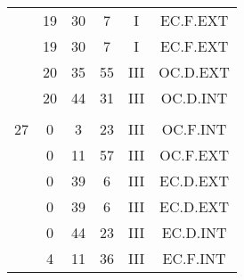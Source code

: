 \documentclass[12pt, a4paper]{article}
\begin{document}
\begin{multicols}{3}
{\begin{tabular}{c c c c c c}
	 	 	 	 & 19 & 30 & 7 & I & EC.F.EXT\\%
	 	 	 	 & 19 & 30 & 7 & I & EC.F.EXT\\%
	 	 	 	 & 20 & 35 & 55 & III & OC.D.EXT\\%
	 	 	 	 & 20 & 44 & 31 & III & OC.D.INT\\%
	 	 	 	 & & & & & \\%
	 	 	 	27 & 0 & 3 & 23 & III & OC.F.INT\\%
	 	 	 	 & 0 & 11 & 57 & III & OC.F.EXT\\%
	 	 	 	 & 0 & 39 & 6 & III & EC.D.EXT\\%
	 	 	 	 & 0 & 39 & 6 & III & EC.D.EXT\\%
	 	 	 	 & 0 & 44 & 23 & III & EC.D.INT\\%
	 	 	 	 & 4 & 11 & 36 & III & EC.F.INT\\%
	 	 \end{tabular}
 	}
\end{multicols}
\end{document}
